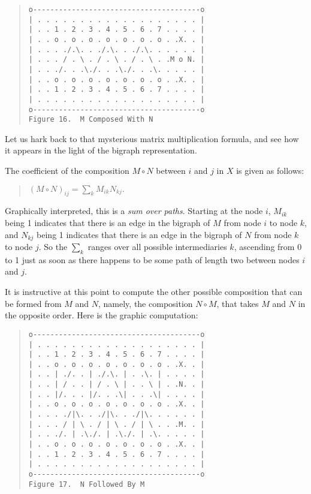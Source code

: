 \documentclass[12pt]{article}
\begin{document}
\begin{quote}\begin{verbatim}
o---------------------------------------o
| . . . . . . . . . . . . . . . . . . . |
| . . 1 . 2 . 3 . 4 . 5 . 6 . 7 . . . . |
| . . o . o . o . o . o . o . o . .X. . |
| . . . ./.\. . ./.\. . ./.\. . . . . . |
| . . . / . \ . / . \ . / . \ . .M o N. |
| . . ./. . .\./. . .\./. . .\. . . . . |
| . . o . o . o . o . o . o . o . .X. . |
| . . 1 . 2 . 3 . 4 . 5 . 6 . 7 . . . . |
| . . . . . . . . . . . . . . . . . . . |
o---------------------------------------o
Figure 16.  M Composed With N
\end{verbatim}\end{quote}

Let us hark back to that mysterious matrix multiplication formula, and see how it appears in the light of the bigraph representation.

The coefficient of the composition $M \circ N$ between $i$ and $j$ in $X$ is given as follows:

\begin{quote}
$(M \circ N)_{ij} = \sum_{k} M_{ik} N_{kj}.$
\end{quote}

Graphically interpreted, this is a \textit{sum over paths}.  Starting at the node $i$, $M_{ik}$ being 1 indicates that there is an edge in the bigraph of $M$ from node $i$ to node $k$, and $N_{kj}$ being 1 indicates that there is an edge in the bigraph of $N$ from node $k$ to node $j$.  So the $\sum_{k}$ ranges over all possible intermediaries $k$, ascending from 0 to 1 just as soon as there happens to be some path of length two between nodes $i$ and $j$.

It is instructive at this point to compute the other possible composition that can be formed from $M$ and $N$, namely, the composition $N \circ M$, that takes $M$ and $N$ in the opposite order.  Here is the graphic computation:

\begin{quote}\begin{verbatim}
o---------------------------------------o
| . . . . . . . . . . . . . . . . . . . |
| . . 1 . 2 . 3 . 4 . 5 . 6 . 7 . . . . |
| . . o . o . o . o . o . o . o . .X. . |
| . . | ./. . | ./.\. | . .\. | . . . . |
| . . | / . . | / . \ | . . \ | . .N. . |
| . . |/. . . |/. . .\| . . .\| . . . . |
| . . o . o . o . o . o . o . o . .X. . |
| . . . ./|\. . ./|\. . ./|\. . . . . . |
| . . . / | \ . / | \ . / | \ . . .M. . |
| . . ./. | .\./. | .\./. | .\. . . . . |
| . . o . o . o . o . o . o . o . .X. . |
| . . 1 . 2 . 3 . 4 . 5 . 6 . 7 . . . . |
| . . . . . . . . . . . . . . . . . . . |
o---------------------------------------o
Figure 17.  N Followed By M
\end{verbatim}\end{quote}
\end{document}
